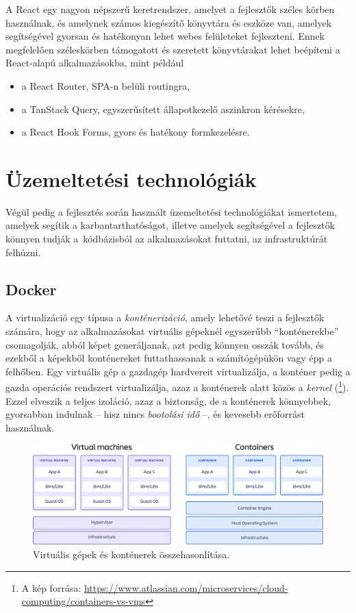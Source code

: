 A React egy nagyon népszerű keretrendszer, amelyet a fejlesztők széles körben használnak, és amelynek számos kiegészítő könyvtára és eszköze van, amelyek segítségével gyorsan és hatékonyan lehet webes felületeket fejleszteni. Ennek megfelelően széleskörben támogatott és szeretett könyvtárakat lehet beépíteni a React-alapú alkalmazásokba, mint például

\begin{itemize}
	\setlength{\itemsep}{1pt}
  \setlength{\parskip}{0pt}
  \setlength{\parsep}{0pt}
	\item a React Router, SPA-n belüli routingra,
	\item a TanStack Query, egyszerűsített állapotkezelő aszinkron kérésekre,
	\item a React Hook Forms, gyors és hatékony formkezelésre.
\end{itemize}

\section{Üzemeltetési technológiák}

Végül pedig a fejlesztés során használt üzemeltetési technológiákat ismertetem, amelyek segítik a karbantarthatóságot, illetve amelyek segítségével a fejlesztők könnyen tudják a~kódbázisból az alkalmazásokat futtatni, az infrastruktúrát felhúzni.

\subsection{Docker}

A virtualizáció egy típusa a \emph{konténerizáció}, amely lehetővé teszi a fejlesztők számára, hogy az alkalmazásokat virtuális gépeknél egyszerűbb ``konténerekbe'' csomagolják, abból képet generáljanak, azt pedig könnyen osszák tovább, és ezekből a képekből konténereket futtathassanak a számítógépükön vagy épp a felhőben. Egy virtuális gép a gazdagép hardvereit virtualizálja, a konténer pedig a gazda operációs rendszert virtualizálja, azaz a konténerek alatt közös a \emph{kernel} (\footnote{A kép forrása: \url{https://www.atlassian.com/microservices/cloud-computing/containers-vs-vms}}). Ezzel elveszik a teljes izoláció, azaz a biztonság, de a konténerek könnyebbek, gyorsabban indulnak -- hisz nincs \emph{bootolási idő} --, és kevesebb erőforrást használnak. 

\begin{figure}[h]
	\centering
	\includegraphics[width=150mm, keepaspectratio]{figures/virtudocker.png}
	\caption{Virtuális gépek és konténerek összehasonlítása.}
	\label{fig:virtudocker}
\end{figure}

